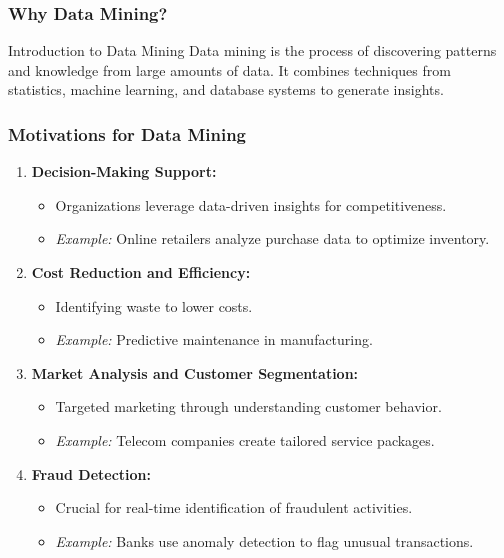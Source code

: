 \documentclass[aspectratio=169]{beamer}
\begin{document}
\begin{frame}[fragile]
    \frametitle{Why Data Mining?}
    \begin{block}{Introduction to Data Mining}
        Data mining is the process of discovering patterns and knowledge from large amounts of data. 
        It combines techniques from statistics, machine learning, and database systems to generate insights.
    \end{block}
\end{frame}

\begin{frame}[fragile]
    \frametitle{Motivations for Data Mining}
    \begin{enumerate}
        \item \textbf{Decision-Making Support:} 
        \begin{itemize}
            \item Organizations leverage data-driven insights for competitiveness.
            \item \textit{Example:} Online retailers analyze purchase data to optimize inventory.
        \end{itemize}
        
        \item \textbf{Cost Reduction and Efficiency:}
        \begin{itemize}
            \item Identifying waste to lower costs.
            \item \textit{Example:} Predictive maintenance in manufacturing.
        \end{itemize}
        
        \item \textbf{Market Analysis and Customer Segmentation:}
        \begin{itemize}
            \item Targeted marketing through understanding customer behavior.
            \item \textit{Example:} Telecom companies create tailored service packages.
        \end{itemize}
        
        \item \textbf{Fraud Detection:}
        \begin{itemize}
            \item Crucial for real-time identification of fraudulent activities.
            \item \textit{Example:} Banks use anomaly detection to flag unusual transactions.
        \end{itemize}
    \end{enumerate}
\end{frame}
\end{document}
